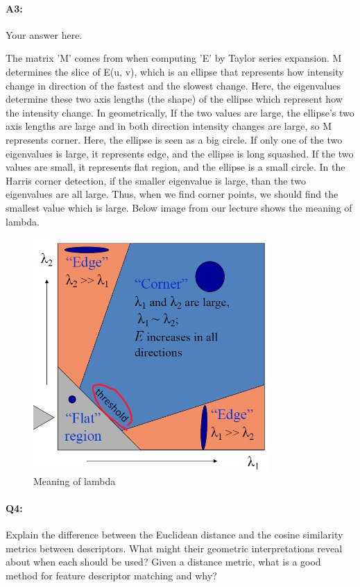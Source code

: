 \paragraph{A3:} Your answer here.


The matrix 'M' comes from when computing 'E' by Taylor series expansion. M determines the slice of E(u, v), which is an ellipse that represents how intensity change in direction of the fastest and the slowest change. Here, the eigenvalues determine these two axis lengths (the shape) of the ellipse which represent how the intensity change. In geometrically, If the two values are large, the ellipse's two axis lengths are large and in both direction intensity changes are large, so  M represents corner. Here, the ellipse is seen as a big circle. If only one of the two eigenvalues is large, it represents edge, and the ellipse is long squashed. If the two values are small, it represents flat region, and the ellipse is a small circle. In the Harris corner detection, if the smaller eigenvalue is large, than the two eigenvalues are all large. Thus, when we find corner points, we should find the smallest value which is large. Below image from our lecture shows the meaning of lambda.

\begin{figure}[h]
    \centering
    \includegraphics[width=9cm]{questions/Fig1.PNG}
    \caption{Meaning of lambda}
    \label{fig:exp1}
\end{figure}



\pagebreak
\paragraph{Q4:} Explain the difference between the Euclidean distance and the cosine similarity metrics between descriptors. What might their geometric interpretations reveal about when each should be used? Given a distance metric, what is a good method for feature descriptor matching and why?

